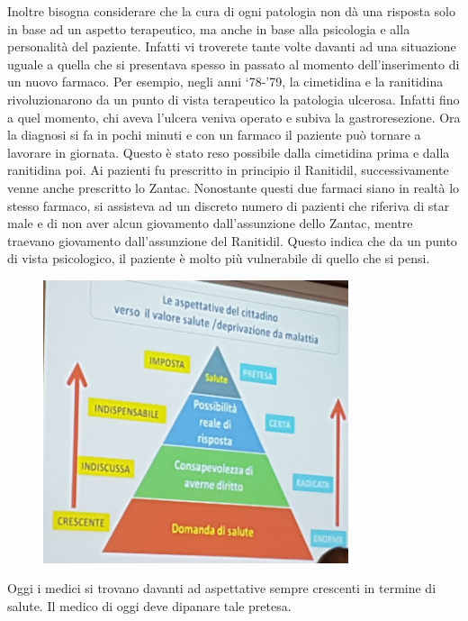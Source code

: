 Inoltre bisogna considerare che la cura di ogni patologia non dà una
risposta solo in base ad un aspetto terapeutico, ma anche in base alla
psicologia e alla personalità del paziente. Infatti vi troverete tante
volte davanti ad una situazione uguale a quella che si presentava spesso
in passato al momento dell'inserimento di un nuovo farmaco. Per esempio,
negli anni `78-'79, la cimetidina e la ranitidina rivoluzionarono da un
punto di vista terapeutico la patologia ulcerosa. Infatti fino a quel
momento, chi aveva l'ulcera veniva operato e subiva la gastroresezione.
Ora la diagnosi si fa in pochi minuti e con un farmaco il paziente può
tornare a lavorare in giornata. Questo è stato reso possibile dalla
cimetidina prima e dalla ranitidina poi. Ai pazienti fu prescritto in
principio il Ranitidil, successivamente venne anche prescritto lo
Zantac. Nonostante questi due farmaci siano in realtà lo stesso farmaco,
si assisteva ad un discreto numero di pazienti che riferiva di star male
e di non aver alcun giovamento dall'assunzione dello Zantac, mentre
traevano giovamento dall'assunzione del Ranitidil. Questo indica che da
un punto di vista psicologico, il paziente è molto più vulnerabile di
quello che si pensi.

\begin{figure}[!ht]
\centering
	\includegraphics[width=0.8\textwidth]{29/image2.jpeg}
	\end{figure}

Oggi
i medici si trovano davanti ad aspettative sempre crescenti in termine
di salute. Il medico di oggi deve dipanare tale pretesa.

